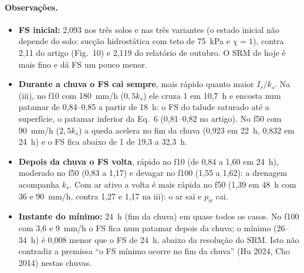 \paragraph{Observações.}
\begin{itemize}
  \item \textbf{FS inicial:} 2,093 nos três solos e nas três variantes (o estado inicial não depende do solo: sucção
    hidrostática com teto de 75~kPa e $\chi = 1$), contra 2,11 do artigo (Fig.~10) e 2,119 do relatório de outubro.
    O SRM de hoje é mais fino e dá FS um pouco menor.
  \item \textbf{Durante a chuva o FS cai sempre}, mais rápido quanto maior $I_r/k_s$. Na (iii), no f10 com 180~mm/h
    ($0{,}5k_s$) ele cruza 1 em 10,7~h e encosta num patamar de 0,84--0,85 a partir de 18~h: o FS do talude saturado
    até a superfície, o patamar inferior da Eq.~6 (0,81--0,82 no artigo). No f50 com 90~mm/h ($2{,}5k_s$) a queda
    acelera no fim da chuva (0,923 em 22~h, 0,832 em 24~h) e o FS fica abaixo de 1 de 19,3 a 32,3~h.
  \item \textbf{Depois da chuva o FS volta}, rápido no f10 (de 0,84 a 1,60 em 24~h), moderado no f50 (0,83 a 1,17) e
    devagar no f100 (1,55 a 1,62): a drenagem acompanha $k_s$. Com ar ativo a volta é mais rápida no f50 (1,39 em
    48~h com 36 e 90~mm/h, contra 1,27 e 1,17 na iii): o ar sai e $p_w$ cai.
  \item \textbf{Instante do mínimo:} 24~h (fim da chuva) em quase todos os casos. No f100 com 3,6 e 9~mm/h o FS fica
    num patamar depois da chuva; o mínimo (26--34~h) é 0,008 menor que o FS de 24~h, abaixo da resolução do SRM. Isto
    não contradiz a premissa ``o FS mínimo ocorre no fim da chuva'' (Hu 2024, Cho 2014) nestas chuvas.
\end{itemize}
